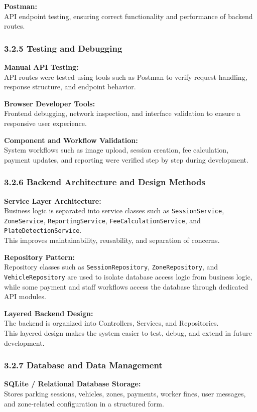 \documentclass[12pt,a4paper,oneside]{report}
\begin{document}
\textbf{Postman:}\\
API endpoint testing, ensuring correct functionality and performance of backend routes.

\subsubsection*{3.2.5 Testing and Debugging}
\textbf{Manual API Testing:}\\
API routes were tested using tools such as Postman to verify request handling, response structure, and endpoint behavior.

\textbf{Browser Developer Tools:}\\
Frontend debugging, network inspection, and interface validation to ensure a responsive user experience.

\textbf{Component and Workflow Validation:}\\
System workflows such as image upload, session creation, fee calculation, payment updates, and reporting were verified step by step during development.

\subsubsection*{3.2.6 Backend Architecture and Design Methods}
\textbf{Service Layer Architecture:}\\
Business logic is separated into service classes such as \texttt{SessionService}, \texttt{ZoneService}, \texttt{ReportingService}, \texttt{FeeCalculationService}, and \texttt{PlateDetectionService}.\\
This improves maintainability, reusability, and separation of concerns.

\textbf{Repository Pattern:}\\
Repository classes such as \texttt{SessionRepository}, \texttt{ZoneRepository}, and \texttt{VehicleRepository} are used to isolate database access logic from business logic, while some payment and staff workflows access the database through dedicated API modules.

\textbf{Layered Backend Design:}\\
The backend is organized into Controllers, Services, and Repositories.\\
This layered design makes the system easier to test, debug, and extend in future development.

\subsubsection*{3.2.7 Database and Data Management}
\textbf{SQLite / Relational Database Storage:}\\
Stores parking sessions, vehicles, zones, payments, worker fines, user messages, and zone-related configuration in a structured form.
\end{document}

